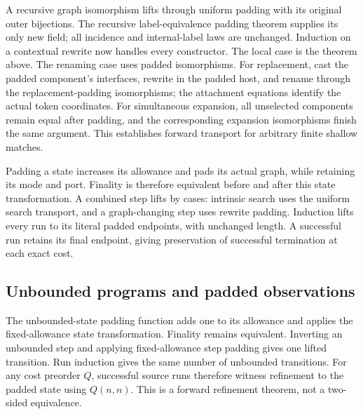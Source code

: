 A recursive graph isomorphism lifts through uniform padding with its
original outer bijections. The recursive label-equivalence padding theorem
supplies its only new field; all incidence and internal-label laws are
unchanged. Induction on a contextual rewrite now handles every constructor.
The local case is the theorem above. The renaming case uses padded
isomorphisms. For replacement, cast the padded component's interfaces,
rewrite in the padded host, and rename through the replacement-padding
isomorphisms; the attachment equations identify the actual token coordinates.
For simultaneous expansion, all unselected components remain equal after
padding, and the corresponding expansion isomorphisms finish the same argument.
This establishes forward transport for arbitrary finite shallow matches.



Padding a state increases its allowance and pads its actual graph, while
retaining its mode and port. Finality is therefore equivalent before and
after this state transformation. A combined step lifts by cases: intrinsic
search uses the uniform search transport, and a graph-changing step uses
rewrite padding. Induction lifts every run to its literal padded endpoints,
with unchanged length. A successful run retains its final endpoint, giving
preservation of successful termination at each exact cost.






\subsection{Unbounded programs and padded observations}

The unbounded-state padding function adds one to its allowance and
applies the fixed-allowance state transformation. Finality remains equivalent.
Inverting an unbounded step and applying fixed-allowance step padding gives
one lifted transition. Run induction gives the same number of unbounded
transitions. For any cost preorder $Q$, successful source runs therefore
witness refinement to the padded state using $Q(n,n)$. This is a forward
refinement theorem, not a two-sided equivalence.

